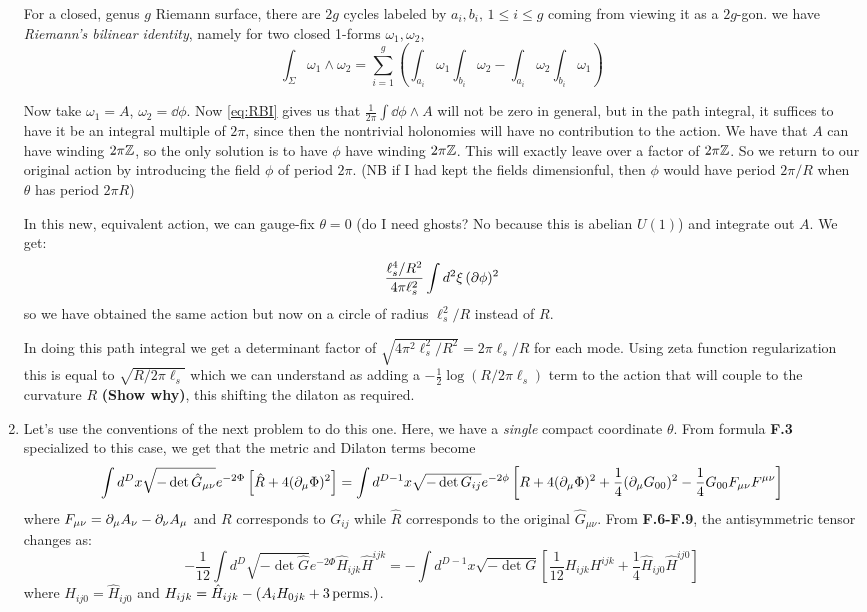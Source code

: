 \documentclass[11pt, class=article, crop=false]{standalone}
\begin{document}
\begin{enumerate}
	For a closed, genus $g$ Riemann surface, there are $2g$ cycles labeled by $a_i, b_i, \, 1\leq i \leq g$ coming from viewing it as a $2g$-gon. we have \emph{Riemann's bilinear identity}, namely for two closed 1-forms $\omega_1, \omega_2$, 
	\begin{equation}\label{eq:RBI}
			\int_\Sigma \omega_1 \wedge \omega_2 = \sum_{i=1}^g \left(\int_{a_i} \omega_1 \int_{b_i} \omega_2 - \int_{a_i} \omega_2 \int_{b_i} \omega_1 \right)	
	\end{equation}

	Now take $\omega_1 = A$, $\omega_2 = \dd \phi$. Now \eqref{eq:RBI} gives us that $\frac{1}{2\pi} \int \dd \phi \wedge A$ will not be zero in general, but in the path integral, it suffices to have it be an integral multiple of $2 \pi$, since then the nontrivial holonomies will have no contribution to the action. We have that $A$ can have winding $2 \pi \mathbb{Z}$, so the only solution is to have $\phi$ have winding $2 \pi \mathbb{Z}$. This will exactly leave over a factor of $2 \pi \mathbb{Z}$. So we return to our original action by introducing the field $\phi$ of period $2\pi$. (NB if I had kept the fields dimensionful, then $\phi$ would have period $2 \pi /R$ when $\theta$ has period $2 \pi R$)
	
	In this new, equivalent action, we can gauge-fix $\theta=0$ (do I need ghosts? No because this is abelian $U(1)$) and integrate out $A$. We get:
	\[
		\frac{\ell_s^4 / R^2}{4\pi \ell_s^2} \int d^2 \xi \, (\partial \phi)^2 
	\]
	so we have obtained the same action but now on a circle of radius $\ell_s^2/R$ instead of $R$. 
	
	In doing this path integral we get a determinant factor of $\sqrt{4 \pi^2 \ell_s^2/R^2} = 2 \pi \ell_s/R$ for each mode. Using zeta function regularization this is equal to $\sqrt{R/2 \pi \ell_s}$ which we can understand as adding a $-\frac12 \log(R/2 \pi \ell_s)$ term to the action that will couple to the curvature $R$ \textbf{(Show why)}, this shifting the dilaton as required.
	
	\item Let's use the conventions of the next problem to do this one. Here, we have a \emph{single} compact coordinate $\theta$. From formula \textbf{F.3} specialized to this case, we get that the metric and Dilaton terms become
	\[
		\int d^D x \sqrt{-\det \hat G_{\mu \nu}} e^{-2 \Phi} \left[\hat R + 4 (\partial_\mu \Phi)^2 \right] = \int d^{D-1}x \sqrt{-\det G_{ij}} e^{-2 \phi} \left[R + 4 (\partial_\mu \Phi)^2 + \frac14 (\partial_\mu G_{00})^2 - \frac14 G_{00} F_{\mu \nu} F^{\mu \nu}  \right]
	\]
	where $F_{\mu \nu} = \partial_\mu A_\nu - \partial_\nu A_\mu$ and $R$ corresponds to $G_{ij}$ while $\hat R$ corresponds to the original $\hat G_{\mu \nu}$. From \textbf{F.6-F.9}, the antisymmetric tensor changes as:
	\[
		-\frac1{12} \int d^D \sqrt{-\det \hat G} e^{-2\Phi} \hat H_{ijk} \hat H^{ijk} = - \int d^{D-1} x \sqrt{-\det G}\left[\frac1{12} H_{ijk} H^{ijk} + \frac14 \hat H_{ij0} \hat H^{ij0} \right]
	\]
	where $H_{ij0} = \hat H_{ij0}$ and $H_{ijk} = \hat H_{ijk} - (A_i H_{0jk} + 3 \,\mathrm{perms.})$. 
	

\end{enumerate}
\end{document}
